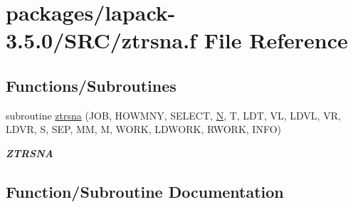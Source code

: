 \hypertarget{ztrsna_8f}{}\section{packages/lapack-\/3.5.0/\+S\+R\+C/ztrsna.f File Reference}
\label{ztrsna_8f}
\subsection*{Functions/\+Subroutines}
\begin{DoxyCompactItemize}
\item 
subroutine \hyperlink{ztrsna_8f_a8bff590a4b5532f139580d376c2aa0c8}{ztrsna} (J\+O\+B, H\+O\+W\+M\+N\+Y, S\+E\+L\+E\+C\+T, \hyperlink{polmisc_8c_a0240ac851181b84ac374872dc5434ee4}{N}, T, L\+D\+T, V\+L, L\+D\+V\+L, V\+R, L\+D\+V\+R, S, S\+E\+P, M\+M, M, W\+O\+R\+K, L\+D\+W\+O\+R\+K, R\+W\+O\+R\+K, I\+N\+F\+O)
\begin{DoxyCompactList}\small\item\em {\bfseries Z\+T\+R\+S\+N\+A} \end{DoxyCompactList}\end{DoxyCompactItemize}


\subsection{Function/\+Subroutine Documentation}
\hypertarget{ztrsna_8f_a8bff590a4b5532f139580d376c2aa0c8}{}
